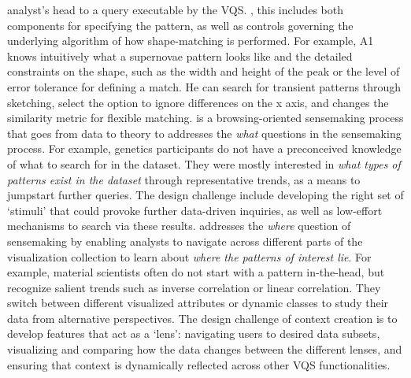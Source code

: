 analyst's head to a query executable by the VQS.
,
this includes both components for specifying the pattern,
as well as controls governing the underlying
algorithm of how shape-matching is performed.
For example, A1 knows intuitively
what a supernovae pattern looks like
and the detailed constraints on the shape,
such as the width and height of the peak
or the level of error tolerance for defining a match.
He can search for transient patterns through sketching,
select the option to ignore differences
on the x axis, and changes the similarity metric for flexible matching.  %
 is
a browsing-oriented sensemaking process
that goes from data to theory to
addresses the \textit{what} questions
in the sensemaking process.
 For example, genetics participants do not
 have a preconceived knowledge of what to search
 for in the dataset.
 They were mostly interested in
 \textit{what types of patterns exist in the dataset}
 through representative trends, as a means to
 jumpstart further queries. %
The design challenge include developing
the right set of `stimuli' that could
provoke further data-driven inquiries,
as well as low-effort mechanisms to search via these results.
 addresses the \textit{where}
question of sensemaking by enabling analysts
to navigate across different parts of the visualization
collection to learn about \textit{where  the patterns of interest lie}.
For example, material scientists often do not start
with a pattern in-the-head, but recognize salient
trends such as inverse correlation or linear correlation.
They switch between different visualized attributes or dynamic
classes to study their data from alternative perspectives.
The design challenge of context creation is to develop
features that act as a `lens': navigating users to desired data subsets,
visualizing and comparing how the data changes between the different lenses, and ensuring that context is dynamically reflected across other VQS functionalities.
